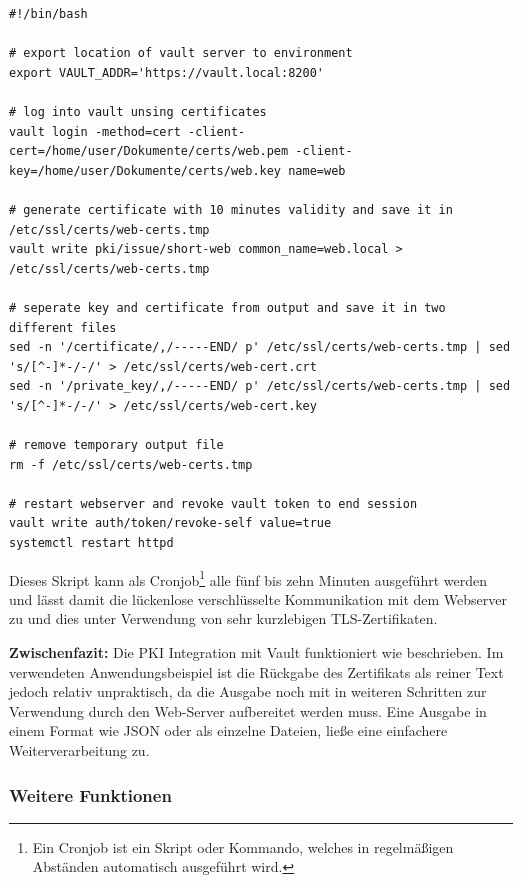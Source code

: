 \documentclass[
book,
a4paper,   
titlepage,  
halfparskip,
12pt        
]{scrartcl}
\begin{document}
\begin{onehalfspacing}
\begin{lstlisting}[caption={[Skript PKI] Shell Skript zum Erstellen eines neuen Benutzerzertifikats unter Verwendung der Vault \ac{PKI}}, label=lst:skript, captionpos=b, basicstyle=\ttfamily] 
#!/bin/bash

# export location of vault server to environment
export VAULT_ADDR='https://vault.local:8200'

# log into vault unsing certificates
vault login -method=cert -client-cert=/home/user/Dokumente/certs/web.pem -client-key=/home/user/Dokumente/certs/web.key name=web

# generate certificate with 10 minutes validity and save it in /etc/ssl/certs/web-certs.tmp
vault write pki/issue/short-web common_name=web.local > /etc/ssl/certs/web-certs.tmp

# seperate key and certificate from output and save it in two different files
sed -n '/certificate/,/-----END/ p' /etc/ssl/certs/web-certs.tmp | sed 's/[^-]*-/-/' > /etc/ssl/certs/web-cert.crt
sed -n '/private_key/,/-----END/ p' /etc/ssl/certs/web-certs.tmp | sed 's/[^-]*-/-/' > /etc/ssl/certs/web-cert.key

# remove temporary output file
rm -f /etc/ssl/certs/web-certs.tmp

# restart webserver and revoke vault token to end session
vault write auth/token/revoke-self value=true
systemctl restart httpd

\end{lstlisting}

Dieses Skript kann als Cronjob\footnote{Ein Cronjob ist ein Skript oder Kommando, welches in regelmäßigen Abständen automatisch ausgeführt wird.} alle fünf bis zehn Minuten ausgeführt werden und lässt damit die lückenlose verschlüsselte Kommunikation mit dem Webserver zu und dies unter Verwendung von sehr kurzlebigen \ac{TLS}-Zertifikaten. 

\textbf{Zwischenfazit:} Die PKI Integration mit Vault funktioniert wie beschrieben. Im verwendeten Anwendungsbeispiel ist die Rückgabe des Zertifikats als reiner Text jedoch relativ unpraktisch, da die Ausgabe noch mit in weiteren Schritten zur Verwendung durch den Web-Server aufbereitet werden muss. Eine Ausgabe in einem Format wie \ac{JSON} oder als einzelne Dateien, ließe eine einfachere Weiterverarbeitung zu.

\subsubsection{Weitere Funktionen}


\end{onehalfspacing}
\end{document}
